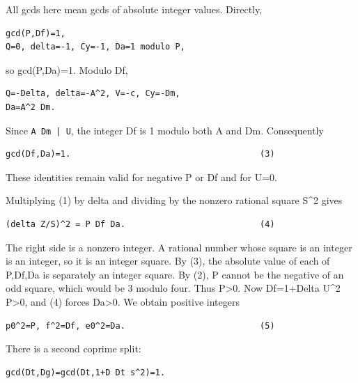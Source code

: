 All gcds here mean gcds of absolute integer values. Directly,



\begin{verbatim}
gcd(P,Df)=1,
Q=0, delta=-1, Cy=-1, Da=1 modulo P,
\end{verbatim}

so gcd(P,Da)=\allowbreak{}1. Modulo Df,



\begin{verbatim}
Q=-Delta, delta=-A^2, V=-c, Cy=-Dm,
Da=A^2 Dm.
\end{verbatim}

Since \texttt{A Dm | U}, the integer Df is 1 modulo both A and Dm. Consequently



\begin{verbatim}
gcd(Df,Da)=1.                                      (3)
\end{verbatim}

These identities remain valid for negative P or Df and for U=\allowbreak{}0.



Multiplying (1) by delta and dividing by the nonzero rational square S\textasciicircum{}\allowbreak{}2 gives



\begin{verbatim}
(delta Z/S)^2 = P Df Da.                           (4)
\end{verbatim}

The right side is a nonzero integer. A rational number whose square is an integer is an integer, so it is an integer square. By (3), the absolute value of each of P,Df,Da is separately an integer square. By (2), P cannot be the negative of an odd square, which would be 3 modulo four. Thus P\textgreater{}\allowbreak{}0. Now Df=\allowbreak{}1+\allowbreak{}Delta U\textasciicircum{}\allowbreak{}2 P\textgreater{}\allowbreak{}0, and (4) forces Da\textgreater{}\allowbreak{}0. We obtain positive integers



\begin{verbatim}
p0^2=P, f^2=Df, e0^2=Da.                           (5)
\end{verbatim}

There is a second coprime split:



\begin{verbatim}
gcd(Dt,Dg)=gcd(Dt,1+D Dt s^2)=1.
\end{verbatim}

